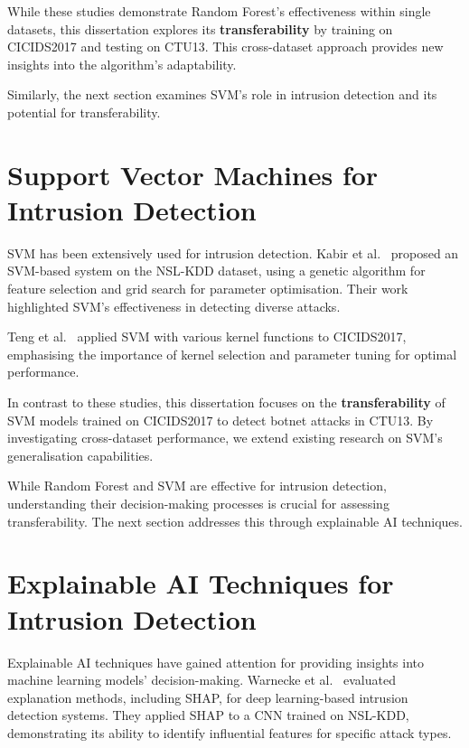 While these studies demonstrate Random Forest’s effectiveness within single datasets, this dissertation explores its \textbf{transferability} by training on CICIDS2017 and testing on CTU13. This cross-dataset approach provides new insights into the algorithm’s adaptability.

Similarly, the next section examines SVM’s role in intrusion detection and its potential for transferability.

\section{Support Vector Machines for Intrusion Detection}\label{sec:SVMIntrusion}

SVM has been extensively used for intrusion detection. Kabir et al.~\cite{kabir2017network} proposed an SVM-based system on the NSL-KDD dataset, using a genetic algorithm for feature selection and grid search for parameter optimisation. Their work highlighted SVM’s effectiveness in detecting diverse attacks.

Teng et al.~\cite{teng2017svm} applied SVM with various kernel functions to CICIDS2017, emphasising the importance of kernel selection and parameter tuning for optimal performance.

In contrast to these studies, this dissertation focuses on the \textbf{transferability} of SVM models trained on CICIDS2017 to detect botnet attacks in CTU13. By investigating cross-dataset performance, we extend existing research on SVM’s generalisation capabilities.

While Random Forest and SVM are effective for intrusion detection, understanding their decision-making processes is crucial for assessing transferability. The next section addresses this through explainable AI techniques.

\section{Explainable AI Techniques for Intrusion Detection}\label{sec:ExplainableAITechniques}

Explainable AI techniques have gained attention for providing insights into machine learning models’ decision-making. Warnecke et al.~\cite{warnecke2020evaluating} evaluated explanation methods, including SHAP, for deep learning-based intrusion detection systems. They applied SHAP to a CNN trained on NSL-KDD, demonstrating its ability to identify influential features for specific attack types.

